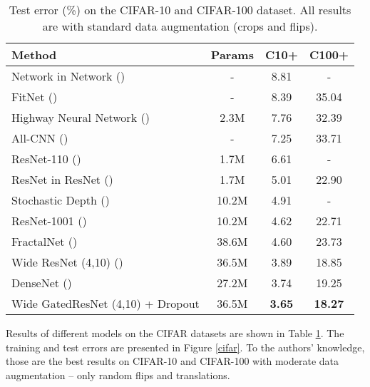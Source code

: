 \documentclass{article} \RequirePackage{amsmath,amsthm,amsfonts,amssymb}
\begin{document}
\begin{table}[h!]
\centering
    \begin{tabular}{ | l | c | c | c |}
    \hline
    Method    			& 		  	Params & C10+  & C100+  \\ \hline

    Network in Network (\cite{nin})			& 			-  & 	8.81  &  - \\ 
    FitNet (\cite{fitnet})			& 			-  & 	8.39   & 	35.04\\ 
    Highway Neural Network (\cite{highway})			& 			2.3M  & 	7.76   & 	32.39 \\
    All-CNN (\cite{allcnn})			& 			-  & 	7.25  & 	33.71  \\
\hline
    ResNet-110 (\cite{resnet1})			& 			1.7M  & 	6.61  & 	- \\ 
    ResNet in ResNet (\cite{rir})			& 			1.7M  & 	5.01   & 	22.90 \\ 
    Stochastic Depth (\cite{stdepth})	& 			10.2M & 	4.91   & 	- \\ 
    ResNet-1001 (\cite{resnet2}) & 			10.2M & 	4.62   & 	22.71 \\ 
    FractalNet (\cite{fractal}) & 			38.6M & 	4.60     & 	23.73 \\ 
    Wide ResNet (4,10) (\cite{wide})	& 			36.5M & 	3.89  & 	18.85 \\ 
    DenseNet (\cite{densenet})	& 			27.2M & 	3.74      & 	19.25\\ 
    Wide GatedResNet (4,10) + Dropout	& 			36.5M 	& 	\textbf{3.65}  & 	\textbf{18.27} \\ \hline
    \end{tabular}
\caption{Test error (\%) on the CIFAR-10 and CIFAR-100 dataset. All results are with standard data augmentation (crops and flips).}
    \label{cifar_all}   
\end{table}

Results of different models on the CIFAR datasets are shown in Table \ref{cifar_all}. The training and test errors are presented in Figure \ref{cifar}. To the authors' knowledge, those are the best results on CIFAR-10 and CIFAR-100 with moderate data augmentation -- only random flips and translations.
\end{document}
